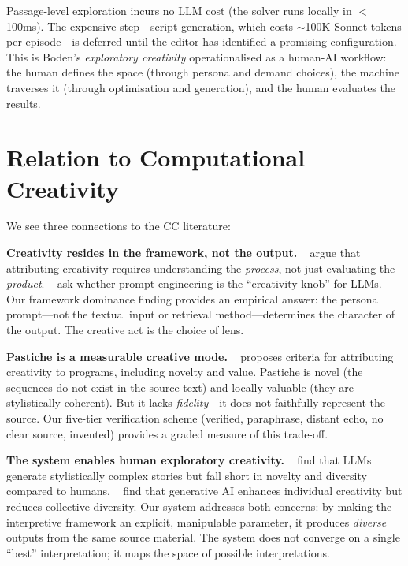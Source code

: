 \documentclass[letterpaper]{article}
\begin{document}
Passage-level exploration incurs no LLM cost (the solver runs locally
in $<$100ms).  The expensive step---script generation, which costs
$\sim$100K Sonnet tokens per episode---is deferred until the editor
has identified a promising configuration.
This is Boden's \emph{exploratory creativity} operationalised as a
human-AI workflow: the human defines the space (through persona and
demand choices), the machine traverses it (through optimisation and
generation), and the human evaluates the results.

\section{Relation to Computational Creativity}

We see three connections to the CC literature:

\textbf{Creativity resides in the framework, not the output.}
\citeauthor{colton2012computational}~
argue that attributing creativity requires understanding the
\emph{process}, not just evaluating the \emph{product}.
\citeauthor{morain2025prompt}~ ask
whether prompt engineering is the ``creativity knob'' for LLMs.  Our
framework dominance finding provides an empirical answer: the persona
prompt---not the textual input or retrieval method---determines the
character of the output.  The creative act is the choice of lens.

\textbf{Pastiche is a measurable creative mode.}
\citeauthor{ritchie2007}~ proposes criteria
for attributing creativity to programs, including novelty and value.
Pastiche is novel (the sequences do not exist in the source text) and
locally valuable (they are stylistically coherent).  But it lacks
\emph{fidelity}---it does not faithfully represent the source.  Our
five-tier verification scheme (verified, paraphrase, distant echo, no
clear source, invented) provides a graded measure of this trade-off.

\textbf{The system enables human exploratory creativity.}
\citeauthor{ismayilzada2025evaluating}~
find that LLMs generate stylistically complex stories but fall short
in novelty and diversity compared to humans.
\citeauthor{doshi2024generative}~ find
that generative AI enhances individual creativity but reduces
collective diversity.  Our system addresses both concerns: by making
the interpretive framework an explicit, manipulable parameter, it
produces \emph{diverse} outputs from the same source material.  The
system does not converge on a single ``best'' interpretation; it maps
the space of possible interpretations.
\end{document}
